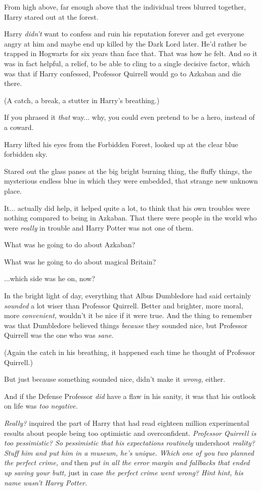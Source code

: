 From high above, far enough above that the individual trees blurred together, Harry stared out at the forest.

Harry \emph{didn't} want to confess and ruin his reputation forever and get everyone angry at him and maybe end up killed by the Dark Lord later. He'd rather be trapped in Hogwarts for six years than face that. That was how he felt. And so it was in fact helpful, a relief, to be able to cling to a single decisive factor, which was that if Harry confessed, Professor Quirrell would go to Azkaban and die there.

(A catch, a break, a stutter in Harry's breathing.)

If you phrased it \emph{that} way... why, you could even pretend to be a hero, instead of a coward.

Harry lifted his eyes from the Forbidden Forest, looked up at the clear blue forbidden sky.

Stared out the glass panes at the big bright burning thing, the fluffy things, the mysterious endless blue in which they were embedded, that strange new unknown place.

It... actually did help, it helped quite a lot, to think that his own troubles were nothing compared to being in Azkaban. That there were people in the world who were \emph{really} in trouble and Harry Potter was not one of them.

What was he going to do about Azkaban?

What was he going to do about magical Britain?

...which side was he on, now?

In the bright light of day, everything that Albus Dumbledore had said certainly \emph{sounded} a lot wiser than Professor Quirrell. Better and brighter, more moral, more \emph{convenient,} wouldn't it be nice if it were true. And the thing to remember was that Dumbledore believed things \emph{because} they sounded nice, but Professor Quirrell was the one who was \emph{sane}.

(Again the catch in his breathing, it happened each time he thought of Professor Quirrell.)

But just because something sounded nice, didn't make it \emph{wrong,} either.

And if the Defense Professor \emph{did} have a flaw in his sanity, it was that his outlook on life was \emph{too negative.}

\emph{Really?} inquired the part of Harry that had read eighteen million experimental results about people being too optimistic and overconfident. \emph{Professor Quirrell is too pessimistic? So pessimistic that his expectations routinely} undershoot \emph{reality? Stuff him and put him in a museum, he's unique. Which one of you two planned the perfect crime, and} then \emph{put in all the error margin and fallbacks that ended up saving your butt,} just in case \emph{the perfect crime went wrong? Hint hint, his name wasn't Harry Potter.}

